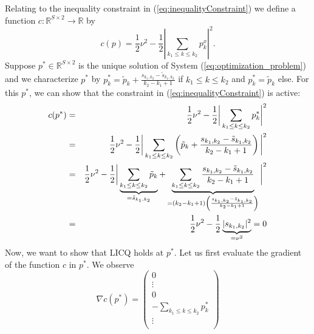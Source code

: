 \documentclass[abstracton]{scrreprt}
\newenvironment{proof}[1][Proof]{\begin{trivlist}
\item[\hskip \labelsep {\bfseries #1}]}{\end{trivlist}}
\begin{document}
\begin{proof}
            Relating to the inequality constraint in (\ref{eq:inequalityConstraint}) we define a function $c: \mathbb{R}^{S \times 2} \to \mathbb{R}$ by
                $$
                    c(p) = \frac{1}{2} \nu^{2} - \frac{1}{2} \left| \sum_{k_{1} \le k \le k_{2}} p^{x}_{k} \right|^{2}.
                $$
            Suppose $p^{\ast} \in \mathbb{R}^{S \times 2}$ is the unique solution of System (\ref{eq:optimization_problem}) and we characterize $p^{\ast}$ by $p^{\ast}_{k} = \tilde{p}_{k} + \frac{s_{k_{1}, k_{2}} - \tilde{s}_{k_{1}, k_{2}}}{k_{2} - k_{1} + 1}$ if $k_{1} \le k \le k_{2}$ and $p^{\ast}_{k} = \tilde{p}_{k}$ else. For this $p^{\ast}$, we can show that the constraint in (\ref{eq:inequalityConstraint}) is active:
                \begin{eqnarray}
                    c(p^{\ast}) &=& \frac{1}{2} \nu^{2} - \frac{1}{2} \bigg|\sum_{k_{1} \le k \le k_{2}} p^{\ast}_{k}\bigg|^{2} \notag \\
                    &=& \frac{1}{2} \nu^{2} - \frac{1}{2} \bigg|\sum_{k_{1} \le k \le k_{2}} \left( \tilde{p}_{k} + \frac{s_{k_{1}, k_{2}} - \tilde{s}_{k_{1}, k_{2}}}{k_{2} - k_{1} + 1} \right) \bigg|^{2} \notag \\
                    &=& \frac{1}{2} \nu^{2} - \frac{1}{2} \bigg| \underbrace{\sum_{k_{1} \le k \le k_{2}} \tilde{p}_{k}}_{= \tilde{s}_{k_{1}, k_{2}}} + \underbrace{\sum_{k_{1} \le k \le k_{2}} \frac{s_{k_{1}, k_{2}} - \tilde{s}_{k_{1}, k_{2}}}{k_{2} - k_{1} + 1}}_{= (k_{2} - k_{1} + 1) \left(\frac{s_{k_{1}, k_{2}} - \tilde{s}_{k_{1}, k_{2}}}{k_{2} - k_{1} + 1}\right)} \bigg|^{2} \label{eq:long_formula} \\
                    &=& \frac{1}{2} \nu^{2} - \frac{1}{2} \underbrace{|s_{k_{1}, k_{2}}|^{2}}_{= \nu^{2}} = 0 \label{eq:short_formula}
                \end{eqnarray}
            Now, we want to show that LICQ holds at $p^{\ast}$. Let us first evaluate the gradient of the function $c$ in $p^{\ast}$. We observe
                $$
                    \nabla c(p^{\ast}) =
                    \begin{pmatrix}
                            0 \\
                            \vdots \\
                            0 \\
                            - \sum\limits_{k_{1} \le k \le k_{2}} p^{\ast}_{k} \\
                            \vdots \\

\end{pmatrix}$$
\end{proof}
\end{document}
